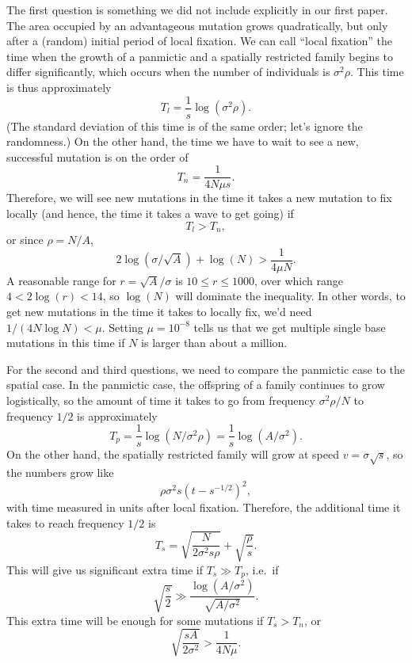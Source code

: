 \documentclass{article}
\begin{document}
The first question is something we did not include explicitly in our first paper.
The area occupied by an advantageous mutation grows quadratically, 
but only after a (random) initial period of local fixation.
We can call ``local fixation'' 
the time when the growth of a panmictic and a spatially restricted family
begins to differ significantly,
which occurs when the number of individuals is $\sigma^2 \rho$.
This time is thus approximately
\[
  T_l = \frac{1}{s} \log (\sigma^2 \rho) .
\]
(The standard deviation of this time is of the same order; let's ignore the randomness.)
On the other hand, the time we have to wait to see a new, successful mutation is on the order of
\[
  T_n = \frac{1}{4N\mu s} .
\]
Therefore, we will see new mutations in the time it takes a new mutation to fix locally
(and hence, the time it takes a wave to get going)
if
\[
    T_l > T_n ,
\]
or since $\rho = N/A$,
\begin{equation} \label{eqn:tlggtn}
  2 \log(\sigma / \sqrt{A}) + \log(N) > \frac{1}{4\mu N} .
\end{equation}
A reasonable range for $r=\sqrt{A}/\sigma$ is $10 \le r \le 1000$,
over which range $4 < 2\log(r) < 14$, so $\log(N)$ will dominate the inequality.
In other words, to get new mutations in the time it takes to locally fix,
we'd need $1/(4 N \log N) < \mu$.
Setting $\mu=10^{-8}$ tells us that we get multiple single base mutations in this time 
if $N$ is larger than about a million.


For the second and third questions,
we need to compare the panmictic case to the spatial case.
In the panmictic case, the offspring of a family continues to grow logistically,
so the amount of time it takes to go from frequency $\sigma^2 \rho / N$ to frequency $1/2$ 
is approximately
\[
  T_p = \frac{1}{s} \log (N/\sigma^2 \rho) = \frac{1}{s} \log(A/\sigma^2) .
\]
On the other hand, the spatially restricted family will grow at speed $v=\sigma \sqrt{s}$, 
so the numbers grow like
\[
  \rho \sigma^2 s \left(t - s^{-1/2} \right)^2,
\]
with time measured in units after local fixation.
Therefore, the additional time it takes to reach frequency $1/2$ is 
\[
T_s = \sqrt{\frac{N}{2\sigma^2 s \rho}} + \sqrt{\frac{\rho}{s}} .
\]
This will give us significant extra time if $T_s \gg T_p$, i.e.\ if
\begin{equation} \label{eqn:tsggtp}
  \sqrt{\frac{s}{2}} \gg \frac{ \log(A/\sigma^2) }{ \sqrt{A/\sigma^2} }. %
\end{equation}
This extra time will be enough for some mutations if $T_s > T_n$, or
\begin{equation}
  \sqrt{\frac{sA}{2\sigma^2}} > \frac{1}{4N\mu} .
\end{equation}
\end{document}
